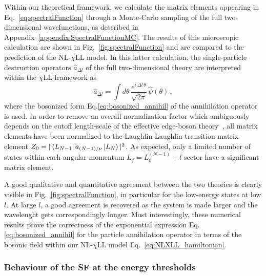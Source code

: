 \documentclass[twocolumn,pra,superscriptaddress,noshowpacs]{revtex4}
\newcommand{\nlchill}{NL-$\chi$LL }
\begin{document}
Within our theoretical framework, we calculate the matrix elements appearing in Eq.~\ref{eq:spectralFunction} through a Monte-Carlo sampling of the full two-dimensional wavefunctions, as described in Appendix~\ref{appendix:SpectralFunctionMC}.
The results of this microscopic calculation are shown in Fig.~\ref{fig:spectralFunction} and are compared to the prediction of the \nlchill model. In this latter calculation, the single-particle destruction operators $\hat{a}_{\Delta l}$ of the full two-dimensional theory are interpreted within the $\chi$LL framework as
\begin{equation}
\hat{a}_{\Delta l} = \int d\theta \,\frac{e^{i\, \Delta l\, \theta}}{\sqrt{2\pi}} \,\hat{\psi}(\theta)\,,    
\end{equation}
where the bosonized form Eq.\eqref{eq:bosonized_annihil}  of the annihilation operator is used.
In order to remove an overall normalization factor which ambiguously depends on the cutoff length-scale of the effective edge-boson theory~\cite{PalaciosMacDonald_PRL_1996,Jolad_PRB_2007,Jolad_PRL_2009,Jolad_PRB_2010,Giamarchi_QP1D_2004}, all matrix elements have been normalized to the Laughlin-Laughlin transition matrix element $Z_0 = |\bra{L_{N-1}}a_{(N-1)/\nu}\ket{L_N}|^2$. As expected, only a limited number of states within each angular momentum $L_f=L_{0}^{(N-1)}+l$ sector have a significant matrix element. 


A good qualitative and quantitative agreement between the two theories is clearly visible in Fig.~\ref{fig:spectralFunction}, in particular for the low-energy states at low $l$. At large $l$, a good agreement is recovered as the system is made larger and the wavelenght gets correspondingly longer. Most interestingly, these numerical results prove the correctness of the exponential expression Eq.\eqref{eq:bosonized_annihil} for the particle annihilation operator in terms of the bosonic field within our \nlchill model Eq.~\eqref{eq:NLXLL_hamiltonian}.

\subsubsection{Behaviour of the SF at the energy thresholds}
\end{document}
